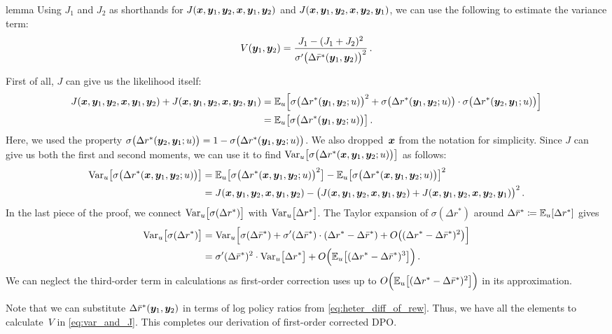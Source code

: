 \begin{theoremEnd}[restate]{lemma}
Using $J_1$ and $J_2$ as shorthands for $J({\bm{x}}, {\bm{y}}_1, {\bm{y}}_2, {\bm{x}}, {\bm{y}}_1, {\bm{y}}_2)$ and $J({\bm{x}}, {\bm{y}}_1, {\bm{y}}_2, {\bm{x}}, {\bm{y}}_2, {\bm{y}}_1)$, we can use the following to estimate the variance term:
%
\begin{equation}
\label{eq:var_and_J}
    V({\bm{y}}_1, {\bm{y}}_2) = \frac{J_1 - (J_1 + J_2)^2}{\sigma'\big(\Delta {\bar{r}}^*({\bm{y}}_1, {\bm{y}}_2)\big)^2}
    \,.
\end{equation}
%
\end{theoremEnd}
\begin{proofEnd}
    First of all, $J$ can give us the likelihood itself:
    \begin{align*}
        J({\bm{x}}, {\bm{y}}_1, {\bm{y}}_2, {\bm{x}}, {\bm{y}}_1, {\bm{y}}_2) + J({\bm{x}}, {\bm{y}}_1, {\bm{y}}_2, {\bm{x}}, {\bm{y}}_2, {\bm{y}}_1) &= \mathbb{E}_u\Big[
        \sigma\big(\Delta r^*({\bm{y}}_1, {\bm{y}}_2; u)\big)^2 + 
        \sigma\big(\Delta r^*({\bm{y}}_1, {\bm{y}}_2; u)\big) \cdot \sigma\big(\Delta r^*({\bm{y}}_2, {\bm{y}}_1; u)\big)
        \Big] \\
        &= \mathbb{E}_u\big[\sigma\big(\Delta r^*({\bm{y}}_1, {\bm{y}}_2; u)\big)\big]
        \,.
    \end{align*}
    Here, we used the property $\sigma\big(\Delta r^*({\bm{y}}_2, {\bm{y}}_1; u)\big) = 1 - \sigma\big(\Delta r^*({\bm{y}}_1, {\bm{y}}_2; u)\big)$. We also dropped~${\bm{x}}$ from the notation for simplicity. Since $J$ can give us both the first and second moments, we can use it to find $\mathrm{Var}_u\big[\sigma\big(\Delta r^*({\bm{x}}, {\bm{y}}_1, {\bm{y}}_2; u)\big)\big]$ as follows:
    \begin{align*}
        \mathrm{Var}_u\big[\sigma\big(\Delta r^*({\bm{x}}, {\bm{y}}_1, {\bm{y}}_2; u)\big)\big] &= \mathbb{E}_u\big[\sigma\big(\Delta r^*({\bm{x}}, {\bm{y}}_1, {\bm{y}}_2; u)\big)^2\big] - \mathbb{E}_u\big[\sigma\big(\Delta r^*({\bm{x}}, {\bm{y}}_1, {\bm{y}}_2; u)\big)\big]^2 \\
        &= J({\bm{x}}, {\bm{y}}_1, {\bm{y}}_2, {\bm{x}}, {\bm{y}}_1, {\bm{y}}_2) - \big(J({\bm{x}}, {\bm{y}}_1, {\bm{y}}_2, {\bm{x}}, {\bm{y}}_1, {\bm{y}}_2) + J({\bm{x}}, {\bm{y}}_1, {\bm{y}}_2, {\bm{x}}, {\bm{y}}_2, {\bm{y}}_1)\big)^2
        \,.
    \end{align*}
    In the last piece of the proof, we connect $\mathrm{Var}_u\big[\sigma(\Delta r^*)\big]$ with $\mathrm{Var}_u\big[\Delta r^*\big]$. The Taylor expansion of $\sigma(\Delta r^*)$ around $\Delta {\bar{r}}^* \coloneqq \mathbb{E}_u[\Delta r^*]$ gives
    \begin{align*}
        \mathrm{Var}_u\big[\sigma(\Delta r^*)\big] &= \mathrm{Var}_u\Big[\sigma(\Delta {\bar{r}}^*) + \sigma'(\Delta {\bar{r}}^*) \cdot (\Delta r^* - \Delta {\bar{r}}^*) + O\big((\Delta r^* - \Delta {\bar{r}}^*)^2\big)\Big] \\
        &= \sigma'(\Delta {\bar{r}}^*)^2 \cdot \mathrm{Var}_u\big[\Delta r^*\big] + O\Big(\mathbb{E}_u\big[(\Delta r^* - \Delta {\bar{r}}^*)^3\big]\Big)
        \,.
    \end{align*}
    We can neglect the third-order term in calculations as first-order correction uses up to $O\Big(\mathbb{E}_u\big[(\Delta r^* - \Delta {\bar{r}}^*)^2\big]\Big)$ in its approximation.  
\end{proofEnd}
Note that we can substitute $\Delta {\bar{r}}^*({\bm{y}}_1, {\bm{y}}_2)$ in terms of log policy ratios from \cref{eq:heter_diff_of_rew}. Thus, we have all the elements to calculate~$V$ in \cref{eq:var_and_J}. This completes our derivation of first-order corrected DPO.


